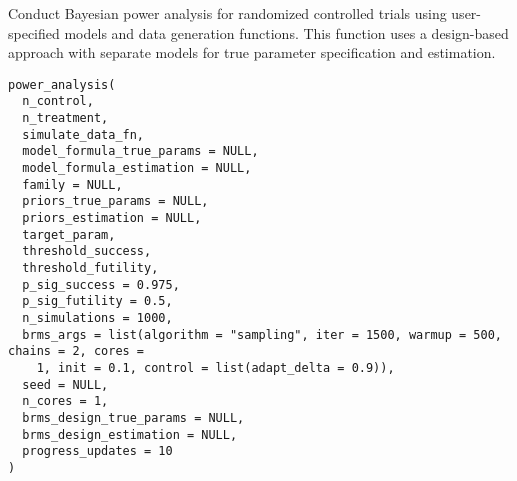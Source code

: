 \documentclass[letterpaper]{book}
\begin{document}
%
\begin{Description}
Conduct Bayesian power analysis for randomized controlled trials using user-specified
models and data generation functions. This function uses a design-based approach with
separate models for true parameter specification and estimation.
\end{Description}
%
\begin{Usage}
\begin{verbatim}
power_analysis(
  n_control,
  n_treatment,
  simulate_data_fn,
  model_formula_true_params = NULL,
  model_formula_estimation = NULL,
  family = NULL,
  priors_true_params = NULL,
  priors_estimation = NULL,
  target_param,
  threshold_success,
  threshold_futility,
  p_sig_success = 0.975,
  p_sig_futility = 0.5,
  n_simulations = 1000,
  brms_args = list(algorithm = "sampling", iter = 1500, warmup = 500, chains = 2, cores =
    1, init = 0.1, control = list(adapt_delta = 0.9)),
  seed = NULL,
  n_cores = 1,
  brms_design_true_params = NULL,
  brms_design_estimation = NULL,
  progress_updates = 10
)
\end{verbatim}
\end{Usage}
%
\end{document}
